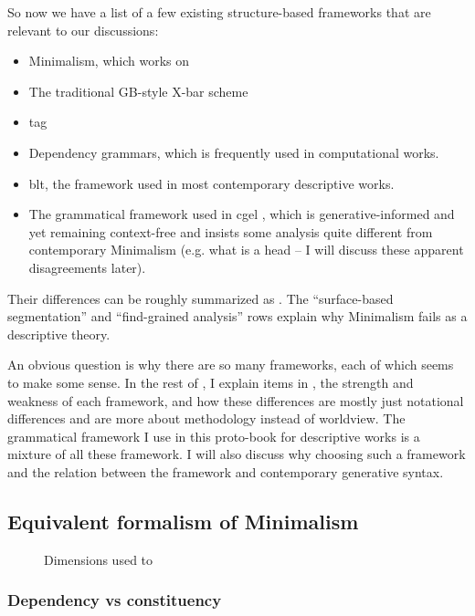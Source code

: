 \documentclass[../main.tex]{subfiles}
\begin{document}
So now we have a list of a few existing structure-based frameworks that are relevant to our discussions:
\begin{itemize}
    \item Minimalism, which works on 
    \item The traditional GB-style X-bar scheme
    \item \ac{tag}  %
    \item Dependency grammars, which is frequently used in computational works.
    \item \ac{blt}, the framework used in most contemporary descriptive works.
    \item The grammatical framework used in \ac{cgel} \citep{cgel,pullum2008expressive}, which is generative-informed and yet remaining 
    context-free and insists some analysis quite different from contemporary Minimalism (e.g. 
    what is a head -- I will discuss these apparent disagreements later).
\end{itemize}
Their differences can be roughly summarized as . 
The ``surface-based segmentation'' and ``find-grained analysis'' rows explain why Minimalism fails as a 
descriptive theory. 

An obvious question is why there are so many frameworks, each of which seems to make some sense. 
In the rest of , I explain items in , the strength and weakness 
of each framework, and how these differences
are mostly just notational differences and are more about methodology instead of worldview. The grammatical framework I use in this proto-book for 
descriptive works is a mixture of all these framework. I will also discuss why choosing such a 
framework and the relation between the framework and contemporary generative syntax.



\subsection{Equivalent formalism of Minimalism}

\begin{figure}
    \centering
    
    \caption{Dimensions used to } %
\end{figure}

\subsubsection{Dependency vs constituency}
\end{document}
